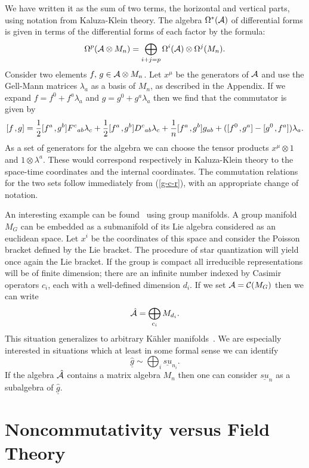 \documentclass[a4paper,12pt]{article}
\def\h#1{\hat #1}
\def\c#1{{\cal #1}}
\def\k{\kern-.1em\mathbin{,}\kern-.1em}
\newcommand{\initiate}{\setcounter{equation}{0}}
\begin{document}
We have written it as the sum of two terms, the horizontal and
vertical parts, using notation from Kaluza-Klein theory.  The algebra
$\Omega^*(\c{A})$ of differential forms is given in terms of the
differential forms of each factor by the formula:
\begin{equation}
\Omega^p(\c{A}\otimes M_n) = 
\bigoplus_{i+j = p} \Omega^i(\c{A})
\otimes \Omega^j(M_n).                                        \label{p-cal}
\end{equation}
Consider two elements $f,\,g \in \c{A}\otimes M_n$.  Let $x^\mu$ be
the generators of $\c{A}$ and use the Gell-Mann matrices $\lambda_a$
as a basis of $M_n$, as described in the Appendix. If we expand 
$f = f^0 + f^a \lambda_a$ and $g = g^0 + g^a \lambda_a$ then we find that
the commutator is given by
$$
[f\k g] = \frac 12 [f^a \k g^b] F^c{}_{ab} \lambda_c + \frac 12
[f^a \k g^b] D^c{}_{ab} \lambda_c + \frac 1n [f^a \k g^b] g_{ab} +
([f^0\k g^a] - [g^0\k f^a]) \lambda_a.
$$
As a set of generators for the algebra we can choose the tensor
products $x^\mu \otimes 1$ and $1\otimes \lambda^a$. These would
correspond respectively in Kaluza-Klein theory to the space-time
coordinates and the internal coordinates. The commutation relations
for the two sets follow immediately from (\ref{g-c-r}), with an
appropriate change of notation.

An interesting example can be found~\cite{JurSch00} using group
manifolds. A group manifold $M_G$ can be embedded as a submanifold of
its Lie algebra considered as an euclidean space. Let $x^i$ be the
coordinates of this space and consider the Poisson bracket defined by
the Lie bracket. The procedure of star quantization will yield once
again the Lie bracket. If the group is compact all irreducible
representations will be of finite dimension; there are an infinite
number indexed by Casimir operators $c_i$, each with a well-defined
dimension $d_i$. If we set $\c{A} = \c{C}(M_G)$ then we can write
$$
\h{\c}{A} = \bigoplus_{c_i} M_{d_i}.
$$
This situation generalizes to arbitrary K\"ahler
manifolds~\cite{Sch99}. We are especially interested in situations which
at least in some formal sense we can identify
\begin{equation}
\underline{\h{g}} \sim \bigoplus_{i} \underline{su}_{n_i}.
\label{sum}
\end{equation}
If the algebra $\h{\c}{A}$ contains a matrix algebra $M_n$ then one
can consider $\underline{su}_{n}$ as a subalgebra of
$\underline{\h{g}}$.


\initiate
\section{Noncommutativity versus Field Theory}
\end{document}
